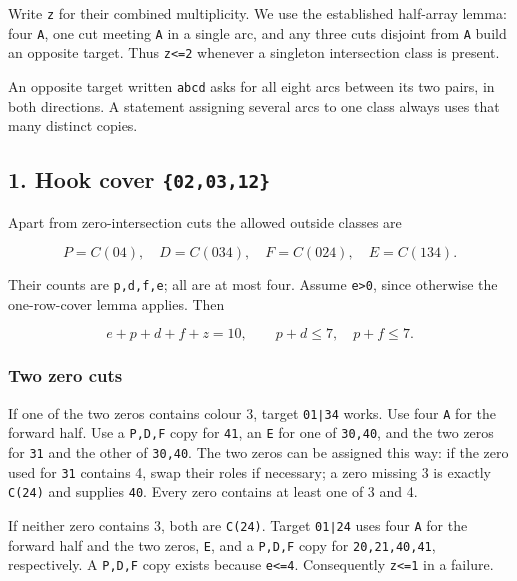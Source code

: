 \documentclass[
  10pt,
]{article}
\begin{document}
Write \texttt{z} for their combined multiplicity. We use the established
half-array lemma: four \texttt{A}, one cut meeting \texttt{A} in a
single arc, and any three cuts disjoint from \texttt{A} build an
opposite target. Thus \texttt{z\textless{}=2} whenever a singleton
intersection class is present.

An opposite target written \texttt{ab\textbar{}cd} asks for all eight
arcs between its two pairs, in both directions. A statement assigning
several arcs to one class always uses that many distinct copies.

\hypertarget{hook-cover-020312}{%
\subsection*{\texorpdfstring{1. Hook cover
\texttt{\{02,03,12\}}}{1. Hook cover \{02,03,12\}}}\label{hook-cover-020312}}

Apart from zero-intersection cuts the allowed outside classes are

\[
P=C(04),\quad D=C(034),\quad F=C(024),\quad E=C(134).
\]

Their counts are \texttt{p,d,f,e}; all are at most four. Assume
\texttt{e\textgreater{}0}, since otherwise the one-row-cover lemma
applies. Then

\[
e+p+d+f+z=10,\qquad p+d\le7,\quad p+f\le7.
\]

\hypertarget{two-zero-cuts}{%
\subsubsection*{Two zero cuts}\label{two-zero-cuts}}

If one of the two zeros contains colour 3, target \texttt{01∣34} works.
Use four \texttt{A} for the forward half. Use a \texttt{P,D,F} copy for
\texttt{41}, an \texttt{E} for one of \texttt{30,40}, and the two zeros
for \texttt{31} and the other of \texttt{30,40}. The two zeros can be
assigned this way: if the zero used for \texttt{31} contains 4, swap
their roles if necessary; a zero missing 3 is exactly \texttt{C(24)} and
supplies \texttt{40}. Every zero contains at least one of 3 and 4.

If neither zero contains 3, both are \texttt{C(24)}. Target
\texttt{01∣24} uses four \texttt{A} for the forward half and the two
zeros, \texttt{E}, and a \texttt{P,D,F} copy for \texttt{20,21,40,41},
respectively. A \texttt{P,D,F} copy exists because
\texttt{e\textless{}=4}. Consequently \texttt{z\textless{}=1} in a
failure.
\end{document}
